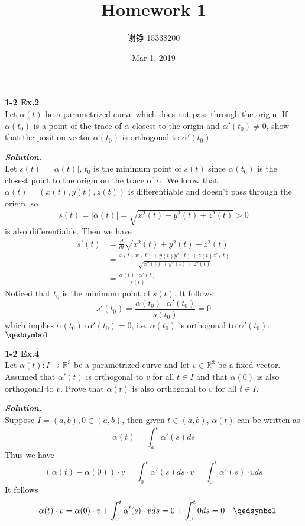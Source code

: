 \documentclass{article}
\begin{document}
\author{谢铮 15338200}
\title{Homework 1}
\date{Mar 1, 2019}
\maketitle

\setlength\parindent{0em}   %
\setlength\parskip{1.0\baselineskip} %

\par
\textbf{1-2 Ex.2}\\
Let $\alpha(t)$ be a parametrized curve which does not pass through the origin. If $\alpha(t_0)$
is a point of the trace of $\alpha$ closest to the origin and $\alpha'(t_0) \neq 0$, show that the 
position vector $\alpha(t_0)$ is orthogonal to $\alpha'(t_0)$.

\par
\textbf{\textit{Solution.}}\\
Let $s(t) = |\alpha(t)|$, $t_0$ is the minimum point of $s(t)$ since $\alpha(t_0)$ is the closest 
point to the origin on the trace of $\alpha$.
We know that $\alpha(t) = (x(t), y(t), z(t))$ is differentiable and doesn't pass through the origin, so
$$
s(t) = |\alpha(t)| = \sqrt{x^2(t) + y^2(t) + z^2(t)} > 0
$$ 
is also differentiable. Then we have
$$
\begin{aligned}
s'(t) &= \frac{d}{dt}\sqrt{x^2(t) + y^2(t) + z^2(t)}\\ 
&=\frac{x(t)x'(t) + y(t)y'(t) + z(t)z'(t)}{\sqrt{x^2(t) + y^2(t) + z^2(t)}}\\
&=\frac{\alpha(t) \cdot \alpha'(t)}{s(t)}
\end{aligned}
$$
Noticed that $t_0$ is the minimum point of $s(t)$, It follows
$$
s'(t_0) = \frac{\alpha(t_0) \cdot \alpha'(t_0)}{s(t_0)} = 0
$$
which implies $\alpha(t_0) \cdot \alpha'(t_0) = 0$, i.e. $\alpha(t_0)$ is orthogonal to $\alpha'(t_0)$. \quad $\qedsymbol$

\par
\textbf{1-2 Ex.4}\\
Let $\alpha(t): I \to \mathbb{R}^3$ be a parametrized curve and let $v \in \mathbb{R}^3$ be a fixed
vector. Assumed that $\alpha'(t)$ is orthogonal to $v$ for all $t \in I$ and that $\alpha(0)$ is also
orthogonal to $v$. Prove that $\alpha(t)$ is also orthogonal to $v$ for all $t \in I$.

\par
\textbf{\textit{Solution.}}\\
Suppose $I = (a, b), 0 \in (a, b)$, then given $t \in (a,b)$, $\alpha(t)$ can be written as
$$
    \alpha(t) = \int_a^t\alpha'(s)ds
$$
Thus we have
$$
    (\alpha(t) - \alpha(0)) \cdot v = \int_0^t\alpha'(s)ds \cdot v = \int_0^t\alpha'(s) \cdot v ds
$$
It follows
$$
    \quad \alpha(t) \cdot v = \alpha(0) \cdot v + \int_0^t\alpha'(s) \cdot v ds = 0 + \int_0^t0ds = 0 \quad \qedsymbol
$$
\end{document}

